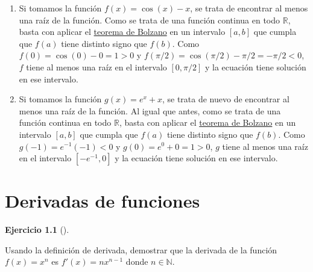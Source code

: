 \documentclass[
  spanish,
  a4paper,
]{scrreport}
\theoremstyle{definition}
\newtheorem{exercise}{Ejercicio}[chapter]
\theoremstyle{remark}
\begin{document}
\begin{tcolorbox}[enhanced jigsaw, arc=.35mm, bottomrule=.15mm, bottomtitle=1mm, breakable, colback=white, colbacktitle=quarto-callout-tip-color!10!white, colframe=quarto-callout-tip-color-frame, coltitle=black, left=2mm, leftrule=.75mm, opacityback=0, opacitybacktitle=0.6, rightrule=.15mm, title=\textcolor{quarto-callout-tip-color}{\faLightbulb}\hspace{0.5em}{Solución}, titlerule=0mm, toprule=.15mm, toptitle=1mm]

\begin{enumerate}
\def\labelenumi{\alph{enumi}.}
\item
  Si tomamos la función \(f(x)=\cos(x)-x\), se trata de encontrar al
  menos una raíz de la función. Como se trata de una función continua en
  todo \(\mathbb{R}\), basta con aplicar el
  \href{https://aprendeconalf.es/analisis-manual/06-limites.html\#thm-bolzano}{teorema
  de Bolzano} en un intervalo \([a,b]\) que cumpla que \(f(a)\) tiene
  distinto signo que \(f(b)\). Como \(f(0)=\cos(0)-0=1>0\) y
  \(f(\pi/2)=\cos(\pi/2)-\pi/2 = -\pi/2<0\), \(f\) tiene al menos una
  raíz en el intervalo \([0,\pi/2]\) y la ecuación tiene solución en ese
  intervalo.
\item
  Si tomamos la función \(g(x)=e^x+x\), se trata de nuevo de encontrar
  al menos una raíz de la función. Al igual que antes, como se trata de
  una función continua en todo \(\mathbb{R}\), basta con aplicar el
  \href{https://aprendeconalf.es/analisis-manual/06-limites.html\#thm-bolzano}{teorema
  de Bolzano} en un intervalo \([a,b]\) que cumpla que \(f(a)\) tiene
  distinto signo que \(f(b)\). Como \(g(-1)=e^{-1}(-1)<0\) y
  \(g(0)=e^0+0=1>0\), \(g\) tiene al menos una raíz en el intervalo
  \([-e^{-1},0]\) y la ecuación tiene solución en ese intervalo.
\end{enumerate}

\end{tcolorbox}


\chapter{Derivadas de funciones}\label{derivadas-de-funciones}

\begin{exercise}[]\protect\hypertarget{exr-derivada-potencia}{}\label{exr-derivada-potencia}

Usando la definición de derivada, demostrar que la derivada de la
función \(f(x)=x^n\) es \(f'(x)=nx^{n-1}\) donde \(n\in\mathbb{N}\).

\end{exercise}
\end{document}
